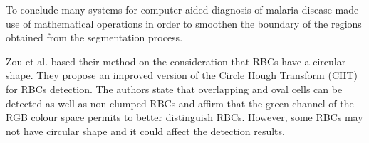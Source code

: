 \documentclass[sensors,review,submit,moreauthors,pdftex,10pt,a4paper]{mdpi}
\begin{document}
To conclude many systems for computer aided diagnosis of malaria disease made use of mathematical operations in order to smoothen the boundary of the regions obtained from the segmentation process.


Zou et al. \cite{Zou2010} based their method on the consideration that RBCs have a circular shape. They propose an improved version of the Circle Hough Transform (CHT) for RBCs detection. The authors state that overlapping and oval cells can be detected as well as non-clumped RBCs and affirm that the green channel of the RGB colour space permits to better distinguish RBCs. However, some RBCs may not have circular shape and it could affect the detection results.
%
\end{document}
